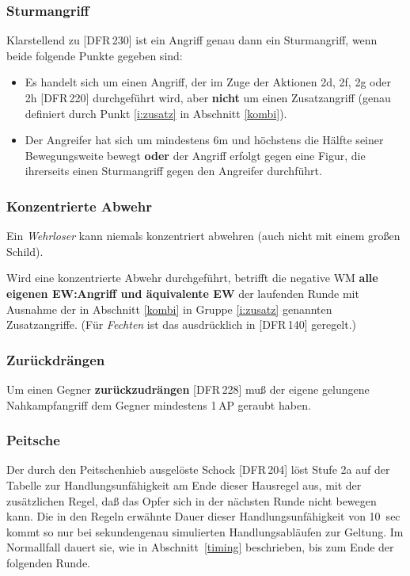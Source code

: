 \documentclass[10pt,a4paper,germanpar]{article}
\begin{document}
\subsubsection{Sturmangriff}
\label{sturm}

Klarstellend zu [DFR\,230] ist ein Angriff genau dann ein
Sturmangriff, wenn beide folgende Punkte gegeben sind:
\begin{itemize}
\item Es handelt sich um einen Angriff, der im Zuge der Aktionen 2d,
  2f, 2g oder 2h [DFR\,220] durchgeführt wird, aber \textbf{nicht} um
  einen Zusatzangriff (genau definiert durch Punkt \ref{i:zusatz} in
  Abschnitt \ref{kombi}).
\item Der Angreifer hat sich um mindestens 6m und höchstens die Hälfte
  seiner Bewegungsweite bewegt \textbf{oder} der Angriff erfolgt gegen
  eine Figur, die ihrerseits einen Sturmangriff gegen den Angreifer
  durchführt.
\end{itemize}

\subsubsection{Konzentrierte Abwehr}

Ein \emph{Wehrloser} kann niemals konzentriert abwehren (auch nicht
mit einem großen Schild).

Wird eine konzentrierte Abwehr durchgeführt, betrifft die negative WM
\textbf{alle eigenen EW:Angriff und äquivalente EW} der laufenden
Runde mit Ausnahme der in Abschnitt \ref{kombi} in Gruppe
\ref{i:zusatz} genannten Zusatzangriffe. (Für \emph{Fechten} ist
das ausdrücklich in [DFR\,140] geregelt.)

\subsubsection{Zurückdrängen}

Um einen Gegner \textbf{zurückzudrängen} [DFR\,228] muß der eigene
gelungene Nahkampfangriff dem Gegner mindestens 1\,AP geraubt haben.

\subsubsection{Peitsche}

Der durch den Peitschenhieb ausgelöste Schock [DFR\,204] löst Stufe 2a
auf der Tabelle zur Handlungsunfähigkeit am Ende dieser Hausregel aus,
mit der zusätzlichen Regel, daß das Opfer sich in der nächsten Runde
nicht bewegen kann. Die in den Regeln erwähnte Dauer dieser
Handlungsunfähigkeit von 10~sec kommt so nur bei sekundengenau
simulierten Handlungsabläufen zur Geltung. Im Normallfall dauert sie,
wie in Abschnitt~\ref{timing} beschrieben, bis zum Ende der folgenden
Runde.
\end{document}
